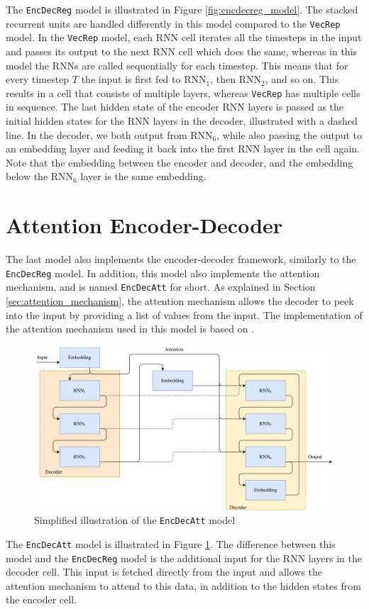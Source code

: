 The {\tt EncDecReg} model is illustrated in Figure \ref{fig:encdecreg_model}. The stacked recurrent units are handled differently in this model compared to the {\tt VecRep} model. In the {\tt VecRep} model, each RNN cell iterates all the timesteps in the input and passes its output to the next RNN cell which does the same, whereas in this model the RNNs are called sequentially for each timestep. This means that for every timestep \(T\) the input is first fed to \(\text{RNN}_1\), then \(\text{RNN}_2\), and so on. This results in a cell that consists of multiple layers, whereas {\tt VecRep} has multiple cells in sequence. The last hidden state of the encoder RNN layers is passed as the initial hidden states for the RNN layers in the decoder, illustrated with a dashed line. In the decoder, we both output from \(\text{RNN}_6\), while also passing the output to an embedding layer and feeding it back into the first RNN layer in the cell again. Note that the embedding between the encoder and decoder, and the embedding below the \(\text{RNN}_6\) layer is the same embedding.


\section{Attention Encoder-Decoder}
\label{sec:attention_encoder_decoder}
The last model also implements the encoder-decoder framework, similarly to the {\tt EncDecReg} model. In addition, this model also implements the attention mechanism, and is named {\tt EncDecAtt} for short. As explained in Section \ref{sec:attention_mechanism}, the attention mechanism allows the decoder to peek into the input by providing a list of values from the input. The implementation of the attention mechanism used in this model is based on \citep{vinyals2015grammar}.

\begin{figure}[!ht]
    \centering
    \includegraphics[width=1\textwidth]{fig/models/encdecatt_model.png}
    \caption{Simplified illustration of the {\tt EncDecAtt} model}
    \label{fig:encdecattg_model}
\end{figure}

The {\tt EncDecAtt} model is illustrated in Figure \ref{fig:encdecattg_model}. The difference between this model and the {\tt EncDecReg} model is the additional input for the RNN layers in the decoder cell. This input is fetched directly from the input and allows the attention mechanism to attend to this data, in addition to the hidden states from the encoder cell.